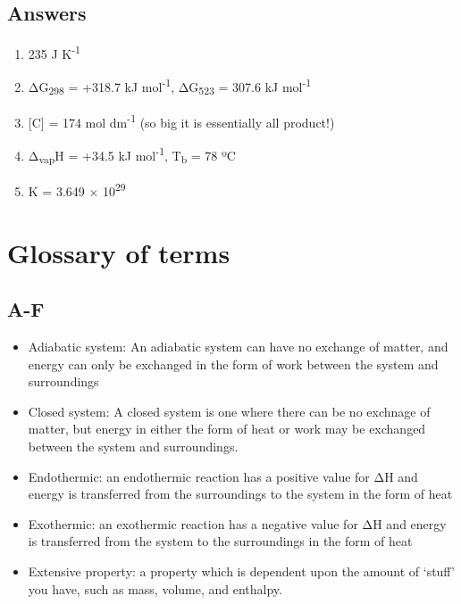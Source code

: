 \documentclass[
]{book}
\begin{document}
\hypertarget{answers-2}{%
\section{Answers}\label{answers-2}}

\begin{enumerate}
\def\labelenumi{\arabic{enumi}.}
\item
  235 J K\textsuperscript{-1}
\item
  ΔG\textsubscript{298} = +318.7 kJ mol\textsuperscript{-1}, ΔG\textsubscript{523} = 307.6 kJ mol\textsuperscript{-1}
\item
  {[}C{]} = 174 mol dm\textsuperscript{-1} (so big it is essentially all product!)
\item
  Δ\textsubscript{vap}H = +34.5 kJ mol\textsuperscript{-1}, T\textsubscript{b} = 78 ºC
\item
  K = 3.649 × 10\textsuperscript{29}
\end{enumerate}

\hypertarget{glossary-of-terms}{%
\chapter*{Glossary of terms}\label{glossary-of-terms}}

\hypertarget{a-f}{%
\section*{A-F}\label{a-f}}

\begin{itemize}
\item
  Adiabatic system: An adiabatic system can have no exchange of matter, and energy can only be exchanged in the form of work between the system and surroundings
\item
  Closed system: A closed system is one where there can be no exchnage of matter, but energy in either the form of heat or work may be exchanged between the system and surroundings.
\item
  Endothermic: an endothermic reaction has a positive value for ΔH and energy is transferred from the surroundings to the system in the form of heat
\item
  Exothermic: an exothermic reaction has a negative value for ΔH and energy is transferred from the system to the surroundings in the form of heat
\item
  Extensive property: a property which is dependent upon the amount of `stuff' you have, such as mass, volume, and enthalpy.
\end{itemize}
\end{document}

